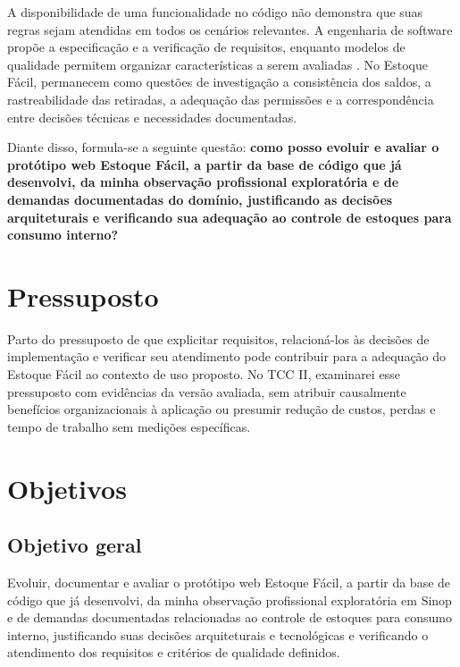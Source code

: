 A disponibilidade de uma funcionalidade no código não demonstra que suas regras sejam atendidas em todos os cenários relevantes. A engenharia de software propõe a especificação e a verificação de requisitos, enquanto modelos de qualidade permitem organizar características a serem avaliadas \cite{SWEBOK2026,ISO25010_2023}. No Estoque Fácil, permanecem como questões de investigação a consistência dos saldos, a rastreabilidade das retiradas, a adequação das permissões e a correspondência entre decisões técnicas e necessidades documentadas.

Diante disso, formula-se a seguinte questão: \textbf{como posso evoluir e avaliar o protótipo web Estoque Fácil, a partir da base de código que já desenvolvi, da minha observação profissional exploratória e de demandas documentadas do domínio, justificando as decisões arquiteturais e verificando sua adequação ao controle de estoques para consumo interno?}

\section{Pressuposto}

Parto do pressuposto de que explicitar requisitos, relacioná-los às decisões de implementação e verificar seu atendimento pode contribuir para a adequação do Estoque Fácil ao contexto de uso proposto. No TCC II, examinarei esse pressuposto com evidências da versão avaliada, sem atribuir causalmente benefícios organizacionais à aplicação ou presumir redução de custos, perdas e tempo de trabalho sem medições específicas.

\section{Objetivos}
\subsection{Objetivo geral}

Evoluir, documentar e avaliar o protótipo web Estoque Fácil, a partir da base de código que já desenvolvi, da minha observação profissional exploratória em Sinop e de demandas documentadas relacionadas ao controle de estoques para consumo interno, justificando suas decisões arquiteturais e tecnológicas e verificando o atendimento dos requisitos e critérios de qualidade definidos.

